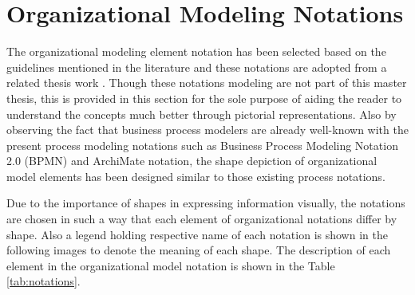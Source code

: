 \section{Organizational Modeling Notations}
\label{sec:resourcecentricorganizationalmodeling}
The organizational modeling element notation has been selected based on the guidelines mentioned in the literature \cite{Moody2009} and these notations are adopted from a related thesis work \cite{Sierr2015}. Though these notations modeling are not part of this master thesis, this is provided in this section for the sole purpose of aiding the reader to understand the concepts much better through pictorial representations. Also by observing  the fact that business process modelers are already well-known with the present process modeling notations such as Business Process Modeling Notation 2.0 (BPMN) \cite{bpm2011} and ArchiMate notation\cite{arc2013}, the shape depiction of organizational model elements has been designed similar to those existing process notations. 

Due to the importance of shapes in expressing information visually, the notations are chosen in such a way that each element of organizational notations  differ by shape. Also a legend holding respective name of each notation is shown in the following images to denote the meaning of each shape. The description of each element in the organizational model notation is shown in the Table \ref{tab:notations}. 

